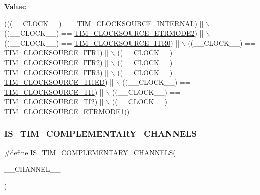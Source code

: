 {\bfseries Value\+:}
\begin{DoxyCode}
(((\_\_CLOCK\_\_) == \hyperlink{group___t_i_m___clock___source_ga9b398a201d8b6a4f200ebde86b1d8f3a}{TIM\_CLOCKSOURCE\_INTERNAL}) || \(\backslash\)
                                       ((\_\_CLOCK\_\_) == \hyperlink{group___t_i_m___clock___source_gab133f0839cf6a4e858457d48f057eea8}{TIM\_CLOCKSOURCE\_ETRMODE2}) ||
       \(\backslash\)
                                       ((\_\_CLOCK\_\_) == \hyperlink{group___t_i_m___clock___source_ga3310aa84f2f322eb77538997c070e56a}{TIM\_CLOCKSOURCE\_ITR0})     || \(\backslash\)
                                       ((\_\_CLOCK\_\_) == \hyperlink{group___t_i_m___clock___source_gae2da814f8d86491e7c344bb8d0f62b96}{TIM\_CLOCKSOURCE\_ITR1})     || \(\backslash\)
                                       ((\_\_CLOCK\_\_) == \hyperlink{group___t_i_m___clock___source_gafb779719a41769b14303da4977f6a5f1}{TIM\_CLOCKSOURCE\_ITR2})     || \(\backslash\)
                                       ((\_\_CLOCK\_\_) == \hyperlink{group___t_i_m___clock___source_ga0cce2af04ad903ba683515c3772abb27}{TIM\_CLOCKSOURCE\_ITR3})     || \(\backslash\)
                                       ((\_\_CLOCK\_\_) == \hyperlink{group___t_i_m___clock___source_gad8c96337acf40356d82570cc4851ce2d}{TIM\_CLOCKSOURCE\_TI1ED})    || \(\backslash\)
                                       ((\_\_CLOCK\_\_) == \hyperlink{group___t_i_m___clock___source_ga0a8708d4dab5cbd557a76efb362e13c0}{TIM\_CLOCKSOURCE\_TI1})      || \(\backslash\)
                                       ((\_\_CLOCK\_\_) == \hyperlink{group___t_i_m___clock___source_ga7950cf616702dd38d8f1ab5091efc012}{TIM\_CLOCKSOURCE\_TI2})      || \(\backslash\)
                                       ((\_\_CLOCK\_\_) == \hyperlink{group___t_i_m___clock___source_gaa7743af6f4b8869cad0375526c6145ce}{TIM\_CLOCKSOURCE\_ETRMODE1}))
\end{DoxyCode}
\mbox{\label{group___t_i_m___private___macros_ga9fc980a033653d2bfc5d7afe9b65ca9f}} 
\subsubsection{\texorpdfstring{I\+S\+\_\+\+T\+I\+M\+\_\+\+C\+O\+M\+P\+L\+E\+M\+E\+N\+T\+A\+R\+Y\+\_\+\+C\+H\+A\+N\+N\+E\+LS}{IS\_TIM\_COMPLEMENTARY\_CHANNELS}}
{\footnotesize\ttfamily \#define I\+S\+\_\+\+T\+I\+M\+\_\+\+C\+O\+M\+P\+L\+E\+M\+E\+N\+T\+A\+R\+Y\+\_\+\+C\+H\+A\+N\+N\+E\+LS(\begin{DoxyParamCaption}\item[{}]{\+\_\+\+\_\+\+C\+H\+A\+N\+N\+E\+L\+\_\+\+\_\+ }\end{DoxyParamCaption})}

